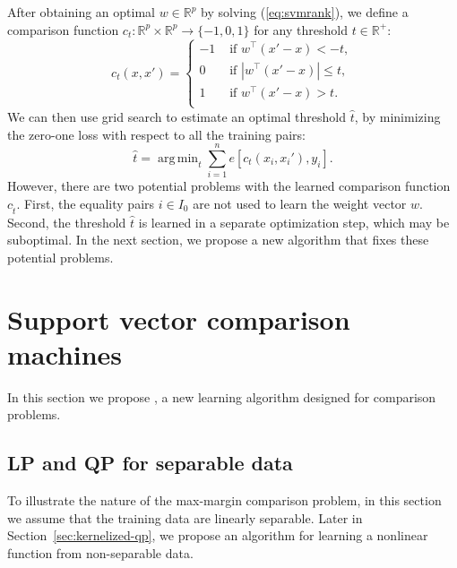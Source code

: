 \documentclass{article}
\newcommand{\RR}{\mathbb R}
\DeclareMathOperator*{\argmin}{arg\,min}
\begin{document}
After obtaining an optimal $w\in\RR^p$ by solving (\ref{eq:svmrank}),
we define a comparison function $c_t:\RR^p\times \RR^p\rightarrow
\{-1, 0, 1\}$ for any threshold $t\in\RR^+$:
\begin{equation}
  \label{eq:svmrank_c_t}
  c_t(x, x') =
  \begin{cases}
    -1 & \text{ if } w^\intercal(x' - x) < -t, \\
    0 & \text{ if } |w^\intercal(x' - x)| \leq t, \\
    1 & \text{ if } w^\intercal(x' - x) > t. \\
  \end{cases}
\end{equation}
We can then use grid search to estimate an optimal threshold $\hat t$,
by minimizing the zero-one loss with respect to all the training
pairs:
\begin{equation}
  \hat t = \argmin_{t}
  \sum_{i=1}^n
  e\left[ c_t(x_i, x_i'), y_i \right].
\end{equation}
However, there are two potential problems with the learned comparison
function $c_{\hat t}$. First, the equality pairs $i\in I_0$ are not
used to learn the weight vector $w$. Second, the threshold $\hat t$ is
learned in a separate optimization step, which may be suboptimal. In
the next section, we propose a new algorithm that fixes these
potential problems.

\section{Support vector comparison machines}
\label{sec:svm-compare}

In this section we propose , a new learning algorithm
designed for comparison problems.

\subsection{LP and QP for separable data}
\label{sec:lp-qp}

To illustrate the nature of the max-margin comparison problem, in this
section we assume that the training data are linearly separable. Later
in Section~\ref{sec:kernelized-qp}, we propose an algorithm for
learning a nonlinear function from non-separable data.
\end{document}

